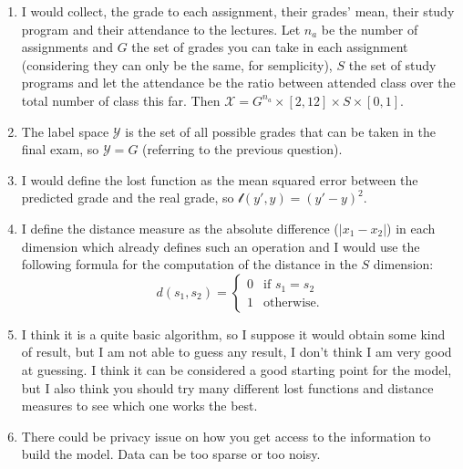 \documentclass[a4paper,12pt]{article}
\begin{document}
\begin{enumerate}
	\item I would collect, the grade to each assignment, their grades' mean,
	      their study program and their attendance to the lectures. Let $n_a$ be
	      the number of assignments and $G$ the set of grades you can take in
	      each assignment (considering they can only be the same, for
	      semplicity), $S$ the set of study programs and let the attendance be
	      the ratio between attended class over the total number of class this
	      far. Then
	      $\mathcal{X} = G^{n_a} \times [2, 12] \times S \times [0, 1]$.

	\item The label space $\mathcal{Y}$ is the set of all possible grades that
	      can be taken in the final exam, so $\mathcal{Y} = G$ (referring to the
	      previous question).

	\item I would define the lost function as the mean squared error between the
	      predicted grade and the real grade, so $\mathcal{l}(y', y) = (y' -
		      y)^2$.

	\item I define the distance measure as the absolute difference
	      ($|x_1 - x_2|$) in each
	      dimension which already defines such an operation and I would use the
	      following formula for the computation of the distance in the $S$
	      dimension:
	      \begin{equation}
		      d(s_1, s_2) = \begin{cases}
			      0 & \text{if } s_1 = s_2 \\
			      1 & \text{otherwise}.
		      \end{cases}
	      \end{equation}

	\item I think it is a quite basic algorithm, so I suppose it would obtain
	      some kind of result, but I am not able to guess any result, I don't
	      think I am very good at guessing. I think it can be considered a good
	      starting point for the model, but I also think you should try many
	      different lost functions and distance measures to see which one works
	      the best.

	\item There could be privacy issue on how you get access to the
	      information to build the model. Data can be too sparse or too noisy.
\end{enumerate}
\end{document}
